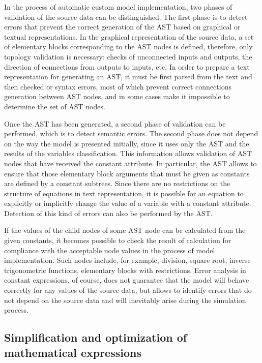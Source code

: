 \documentclass[lettersize,journal]{IEEEtran}
\begin{document}
In the process of automatic custom model implementation, two phases of validation of the source data can be distinguished. 
The first phase is to detect errors that prevent the correct generation of the AST based on graphical or textual representations. 
In the graphical representation of the source data, a set of elementary blocks corresponding to the AST nodes is defined,
therefore, only topology validation is necessary: checks of unconnected inputs and outputs, the direction of connections from
outputs to inputs, etc. In order to prepare a text representation for generating an AST, it must be first parsed from the text 
and then checked or syntax errors, most of which prevent correct connections generation between AST nodes, and in some cases 
make it impossible to determine the set of AST nodes.

Once the AST has been generated, a second phase of validation can be performed, which is to detect semantic errors. The second phase
does not depend on the way the model is presented initially, since it uses only the AST and the results of the variables 
classification. This information allows validation of AST nodes that have received the constant attribute. In particular, 
the AST allows to ensure that those elementary block arguments that must be given as constants are defined by a constant subtrees. Since there are no restrictions on the structure of equations in text representation, it is possible for an equation to explicitly
or implicitly change the value of a variable with a constant attribute. Detection of this kind of errors can also be performed 
by the AST.

If the values of the child nodes of some AST node can be calculated from the given constants, it becomes possible to check 
the result of calculation for compliance with the acceptable node values in the process of model implementation. Such nodes 
include, for example, division, square root, inverse trigonometric functions, elementary blocks with restrictions. 
Error analysis in constant expressions, of course, does not guarantee that the model will behave correctly for any values 
of the source data, but allows to identify errors that do not depend on the source data and will inevitably arise during the simulation process.

\subsection {Simplification and optimization of mathematical expressions} \label{sec_simplification}
\end{document}
